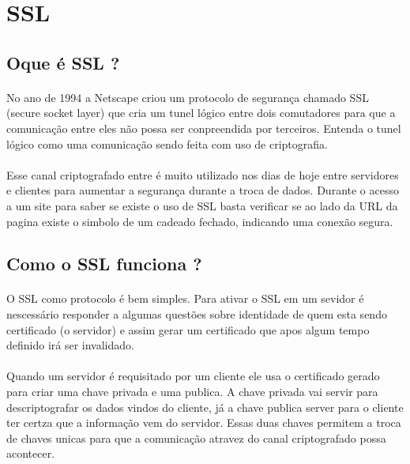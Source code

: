 \documentclass{article}
\begin{document}
  \newpage

  \section{SSL}
  \subsection{Oque é SSL ?}
  \paragraph{}
  No ano de 1994 a Netscape criou um protocolo de segurança chamado SSL (secure
  socket layer) que cria um tunel lógico entre dois comutadores para que a
  comunicação entre eles não possa ser conpreendida por terceiros. Entenda o
  tunel lógico como uma comunicação sendo feita com uso de criptografia.
  \paragraph{}
    Esse canal criptografado entre é muito utilizado nos dias de hoje entre
  servidores e clientes para aumentar a segurança durante a troca de dados.
  Durante o acesso a um site para saber se existe o uso de SSL basta verificar
  se ao lado da URL da pagina existe o simbolo de um cadeado fechado, indicando
  uma conexão segura.

  \subsection{Como o SSL funciona ?}
  \paragraph{}
  O SSL como protocolo é bem simples. Para ativar o SSL em um sevidor é
  nescessário responder a algumas questões sobre identidade de quem esta sendo
  certificado (o servidor) e assim gerar um certificado que apos algum tempo
  definido irá ser invalidado.
  \paragraph{}
    Quando um servidor é requisitado por um cliente ele usa o certificado gerado
  para criar uma chave privada e uma publica. A chave privada vai servir para
  descriptografar os dados vindos do cliente, já a chave publica server para o
  cliente ter certza que a informação vem do servidor. Essas duas chaves permitem
  a troca de chaves unicas para que a comunicação atravez do canal criptografado
  possa acontecer.
\end{document}
